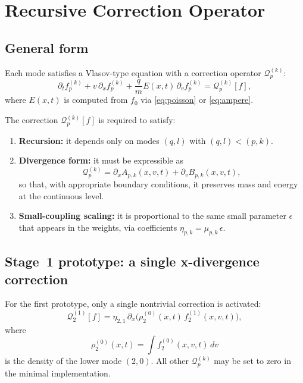 \documentclass[11pt]{article}
\begin{document}
\section{Recursive Correction Operator}

\subsection{General form}

Each mode satisfies a Vlasov-type equation with a correction operator
$\mathcal{Q}_p^{(k)}$:
\begin{equation}
  \partial_t f_p^{(k)} + v\,\partial_x f_p^{(k)} 
  + \frac{q}{m} E(x,t)\,\partial_v f_p^{(k)}
  = \mathcal{Q}_p^{(k)}[f],
  \label{eq:mode_vlasov_general}
\end{equation}
where $E(x,t)$ is computed from $f_0$ via \eqref{eq:poisson} or
\eqref{eq:ampere}.

The correction $ \mathcal{Q}_p^{(k)}[f] $ is required to satisfy:
\begin{enumerate}
  \item \textbf{Recursion:} it depends only on modes $(q,l)$ with $(q,l) < (p,k)$.
  \item \textbf{Divergence form:} it must be expressible as
        \[
          \mathcal{Q}_p^{(k)} = \partial_x A_{p,k}(x,v,t)
                                + \partial_v B_{p,k}(x,v,t),
        \]
        so that, with appropriate boundary conditions, it preserves mass and
        energy at the continuous level.
  \item \textbf{Small-coupling scaling:} it is proportional to the same small
        parameter $\epsilon$ that appears in the weights, via coefficients
        $\eta_{p,k} = \mu_{p,k}\,\epsilon$.
\end{enumerate}

\subsection{Stage~1 prototype: a single x-divergence correction}

For the first prototype, only a single nontrivial correction is activated:
\begin{equation}
  \mathcal{Q}_2^{(1)}[f]
  =
  \eta_{2,1}\,\partial_x\Big(\rho_2^{(0)}(x,t)\,f_2^{(1)}(x,v,t)\Big),
  \label{eq:Q21_def}
\end{equation}
where
\[
  \rho_2^{(0)}(x,t) = \int f_2^{(0)}(x,v,t)\,dv
\]
is the density of the lower mode $(2,0)$. All other $\mathcal{Q}_p^{(k)}$ may
be set to zero in the minimal implementation.
\end{document}
